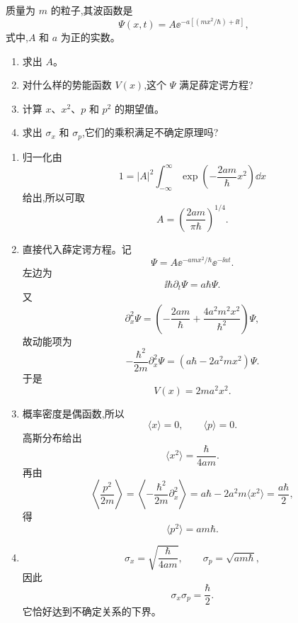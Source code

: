 \begin{question}
质量为 $m$ 的粒子,其波函数是
\[
\Psi(x,t)=A \ee^{-a[(mx^2/\hbar)+\ii t]},
\]
式中,$A$ 和 $a$ 为正的实数。
\begin{enumerate}
\item 求出 $A$。
\item 对什么样的势能函数 $V(x)$,这个 $\Psi$ 满足薛定谔方程?
\item 计算 $x$、$x^2$、$p$ 和 $p^2$ 的期望值。
\item 求出 $\sigma_x$ 和 $\sigma_p$,它们的乘积满足不确定原理吗?
\end{enumerate}
\end{question}
\begin{solution}
\begin{enumerate}
\item 归一化由
\[
1=|A|^2\int_{-\infty}^{\infty}\exp\left(-\frac{2am}{\hbar}x^2\right)\dd x
\]
给出,所以可取
\[
A=\left(\frac{2am}{\pi\hbar}\right)^{1/4}.
\]
\item 直接代入薛定谔方程。记
\[
\Psi=A\ee^{-amx^2/\hbar}\ee^{-\ii at}.
\]
左边为
\[
\ii\hbar\partial_t\Psi=a\hbar\Psi.
\]
又
\[
\partial_x^2\Psi=\left(-\frac{2am}{\hbar}+\frac{4a^2m^2x^2}{\hbar^2}\right)\Psi,
\]
故动能项为
\[
-\frac{\hbar^2}{2m}\partial_x^2\Psi=(a\hbar-2a^2mx^2)\Psi.
\]
于是
\[
V(x)=2ma^2x^2.
\]
\item 概率密度是偶函数,所以
\[
\langle x\rangle=0,\qquad \langle p\rangle=0.
\]
高斯分布给出
\[
\langle x^2\rangle=\frac{\hbar}{4am}.
\]
再由
\[
\left\langle \frac{p^2}{2m}\right\rangle
=\left\langle -\frac{\hbar^2}{2m}\partial_x^2\right\rangle
=a\hbar-2a^2m\langle x^2\rangle=\frac{a\hbar}{2},
\]
得
\[
\langle p^2\rangle=am\hbar.
\]
\item
\[
\sigma_x=\sqrt{\frac{\hbar}{4am}},\qquad
\sigma_p=\sqrt{am\hbar},
\]
因此
\[
\sigma_x\sigma_p=\frac{\hbar}{2}.
\]
它恰好达到不确定关系的下界。
\end{enumerate}
\end{solution}

